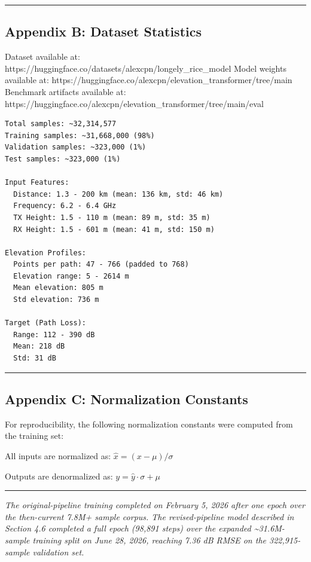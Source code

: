 \documentclass[
]{article}
\begin{document}
\begin{center}\rule{0.5\linewidth}{0.5pt}\end{center}

\subsection{Appendix B: Dataset
Statistics}\label{appendix-b-dataset-statistics}

Dataset available at:
https://huggingface.co/datasets/alexcpn/longely\_rice\_model Model
weights available at:
https://huggingface.co/alexcpn/elevation\_transformer/tree/main
Benchmark artifacts available at:
https://huggingface.co/alexcpn/elevation\_transformer/tree/main/eval

\begin{verbatim}
Total samples: ~32,314,577
Training samples: ~31,668,000 (98%)
Validation samples: ~323,000 (1%)
Test samples: ~323,000 (1%)

Input Features:
  Distance: 1.3 - 200 km (mean: 136 km, std: 46 km)
  Frequency: 6.2 - 6.4 GHz
  TX Height: 1.5 - 110 m (mean: 89 m, std: 35 m)
  RX Height: 1.5 - 601 m (mean: 41 m, std: 150 m)

Elevation Profiles:
  Points per path: 47 - 766 (padded to 768)
  Elevation range: 5 - 2614 m
  Mean elevation: 805 m
  Std elevation: 736 m

Target (Path Loss):
  Range: 112 - 390 dB
  Mean: 218 dB
  Std: 31 dB
\end{verbatim}

\begin{center}\rule{0.5\linewidth}{0.5pt}\end{center}

\subsection{Appendix C: Normalization
Constants}\label{appendix-c-normalization-constants}

For reproducibility, the following normalization constants were computed
from the training set:

All inputs are normalized as: \(\hat{x} = (x - \mu) / \sigma\)

Outputs are denormalized as: \(y = \hat{y} \cdot \sigma + \mu\)

\begin{center}\rule{0.5\linewidth}{0.5pt}\end{center}

\emph{The original-pipeline training completed on February 5, 2026 after
one epoch over the then-current 7.8M+ sample corpus. The
revised-pipeline model described in Section 4.6 completed a full epoch
(98,891 steps) over the expanded \textasciitilde31.6M-sample training
split on June 28, 2026, reaching 7.36 dB RMSE on the 322,915-sample
validation set.}
\end{document}
